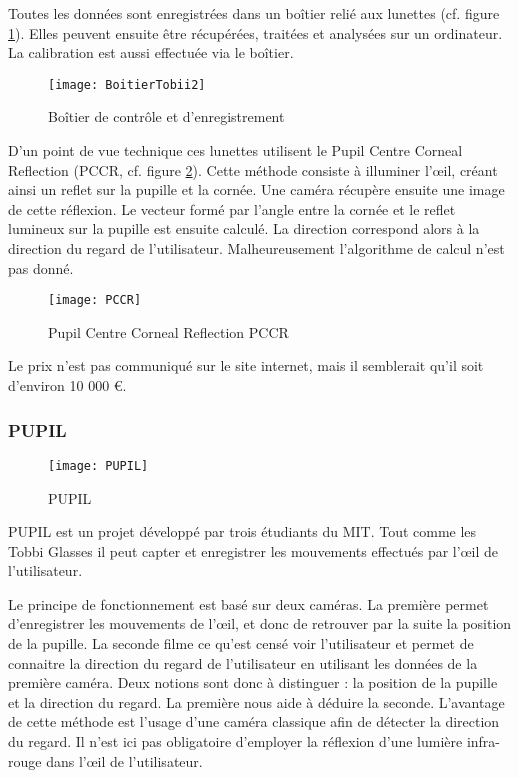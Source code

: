 Toutes les données sont enregistrées dans un boîtier relié aux lunettes (cf. figure \ref{fig:Boitier}). Elles peuvent ensuite être récupérées, traitées et analysées sur un ordinateur. La calibration est aussi effectuée via le boîtier.

\begin{figure}[H]
  \centering
  \texttt{[image: BoitierTobii2]}
  \caption{Boîtier de contrôle et d'enregistrement}
  \label{fig:Boitier}
\end{figure}

D’un point de vue technique ces lunettes utilisent le Pupil Centre Corneal Reflection (PCCR, cf. figure \ref{fig:PCCR}). Cette méthode consiste à illuminer l’œil, créant ainsi un reflet sur la pupille et la cornée. Une caméra récupère ensuite une image de cette réflexion. Le vecteur formé par l’angle entre la cornée et le reflet lumineux sur la pupille est ensuite calculé. La direction correspond alors à la direction du regard de l’utilisateur.
Malheureusement l’algorithme de calcul n’est pas donné.

\begin{figure}[H]
  \centering
  \texttt{[image: PCCR]}
  \caption{Pupil Centre Corneal Reflection PCCR}
  \label{fig:PCCR}
\end{figure}

Le prix n’est pas communiqué sur le site internet, mais il semblerait qu’il soit d’environ 10 000 \euro{}.

\subsubsection{PUPIL}

\begin{figure}[h]
  \centering
  \texttt{[image: PUPIL]}
  \caption{PUPIL}
  \label{fig:PUPIL}
\end{figure}

PUPIL \cite{pupil} est un projet développé par trois étudiants du MIT. Tout comme les Tobbi Glasses il peut capter et enregistrer les mouvements effectués par l’œil de l’utilisateur.

Le principe de fonctionnement est basé sur deux caméras. La première permet d’enregistrer les mouvements de l’œil, et donc de retrouver par la suite la position de la pupille. La seconde filme ce qu’est censé voir l’utilisateur et permet de connaitre la direction du regard de l’utilisateur en utilisant les données de la première caméra.
Deux notions sont donc à distinguer : la position de la pupille et la direction du regard. La première nous aide à déduire la seconde. L’avantage de cette méthode est l’usage d'une caméra classique afin de détecter la direction du regard. Il n’est ici pas obligatoire d’employer la réflexion d’une lumière infra-rouge dans l’œil de l’utilisateur.

